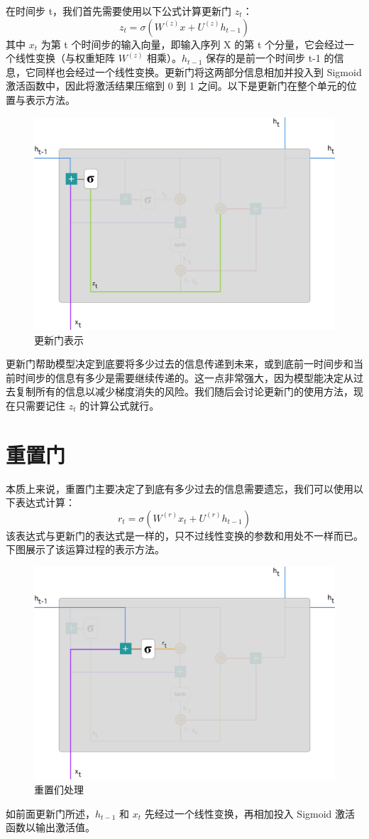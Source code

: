 \documentclass{article}
\begin{document}
在时间步 t，我们首先需要使用以下公式计算更新门 $z_t$：
\[z_t = \sigma(W^{(z)}x+U^{(z)}h_{t-1})\]
其中 $x_t$ 为第 t 个时间步的输入向量，即输入序列 X 的第 t 个分量，它会经过一个线性变换（与权重矩阵 $W^{(z)}$ 相乘）。$h_{t-1}$ 保存的是前一个时间步 t-1 的信息，它同样也会经过一个线性变换。更新门将这两部分信息相加并投入到 Sigmoid 激活函数中，因此将激活结果压缩到 0 到 1 之间。以下是更新门在整个单元的位置与表示方法。
\begin{figure}[H]
	\centering
	\includegraphics[scale=0.2]{GRU4.png}
	\caption{更新门表示}
\end{figure}
更新门帮助模型决定到底要将多少过去的信息传递到未来，或到底前一时间步和当前时间步的信息有多少是需要继续传递的。这一点非常强大，因为模型能决定从过去复制所有的信息以减少梯度消失的风险。我们随后会讨论更新门的使用方法，现在只需要记住 $z_t$ 的计算公式就行。
\section{重置门}
本质上来说，重置门主要决定了到底有多少过去的信息需要遗忘，我们可以使用以下表达式计算：
\[r_t=\sigma(W^{(r)}x_t+U^{(r)}h_{t-1})\]
该表达式与更新门的表达式是一样的，只不过线性变换的参数和用处不一样而已。下图展示了该运算过程的表示方法。
\begin{figure}[H]
	\centering
	\includegraphics[scale=0.2]{GRU5.png}
	\caption{重置们处理}
\end{figure}
如前面更新门所述，$h_{t-1}$ 和 $x_t$ 先经过一个线性变换，再相加投入 Sigmoid 激活函数以输出激活值。
\end{document}
